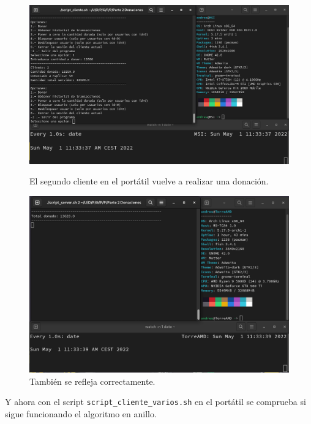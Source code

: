 \documentclass{article}
\begin{document}
\begin{figure}[H]
    \centering
    \begin{minipage}[H]{0.49\textwidth}
        \centering
        \includegraphics[width=\textwidth]{imagenes/multiples ordenadores/Cliente/Screenshot from 2022-05-01 11-33-44.png}
        \caption{El segundo cliente en el portátil vuelve a realizar una donación.}
    \end{minipage}
    \hfill
    \begin{minipage}[H]{0.49\textwidth}
        \centering
        \includegraphics[width=\textwidth]{imagenes/multiples ordenadores/Servidor/Screenshot from 2022-05-01 11-33-44.png}
        \caption{También se refleja correctamente.}
    \end{minipage}
\end{figure}

\newpage

Y ahora con el script \verb|script_cliente_varios.sh| en el portátil se comprueba si sigue funcionando el algoritmo en anillo.
\end{document}

